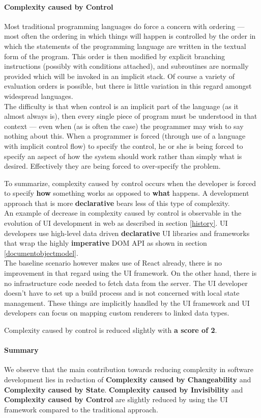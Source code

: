 \paragraph{Complexity caused by Control}
Most traditional programming languages do force a concern with ordering — most often the ordering in which things will happen is controlled by the order in which the statements of the programming language are written in the textual form of the program. This order is then modified by explicit branching instructions (possibly with conditions attached), and subroutines are normally provided which will be invoked in an implicit stack. Of course a variety of evaluation orders is possible, but there is little variation in this regard amongst widespread languages. \\
The difficulty is that when control is an implicit part of the language (as it almost always is), then every single piece of program must be understood in that context — even when (as is often the case) the programmer may wish to say nothing about this. When a programmer is forced (through use of a language with implicit control flow) to specify the control, he or she is being forced to specify an aspect of how the system should work rather than simply what is desired. Effectively they are being forced to over-specify the problem. \citep{outoftarpit}

To summarize, complexity caused by control occurs when the developer is forced to specify \textbf{how} something works as opposed to \textbf{what} happens. A development approach that is more \textbf{declarative} bears less of this type of complexity. \\
An example of decrease in complexity caused by control is observable in the evolution of UI development in web as described in section \ref{history}. UI developers use high-level data driven \textbf{declarative} UI libraries and frameworks that wrap the highly \textbf{imperative} DOM API as shown in section \ref{documentobjectmodel}. \\
The baseline scenario however makes use of React already, there is no improvement in that regard using the UI framework. On the other hand, there is no infrastructure code needed to fetch data from the server. The UI developer doesn't have to set up a build process and is not concerned with local state management. These things are implicitly handled by the UI framework and UI developers can focus on mapping custom renderers to linked data types.

Complexity caused by control is reduced slightly with \textbf{a score of 2}.

\paragraph{Summary}
We observe that the main contribution towards reducing complexity in software development lies in reduction of \textbf{Complexity caused by Changeability} and \textbf{Complexity caused by State}. \textbf{Complexity caused by Invisibility} and \textbf{Complexity caused by Control} are slightly reduced by using the UI framework compared to the traditional approach.
